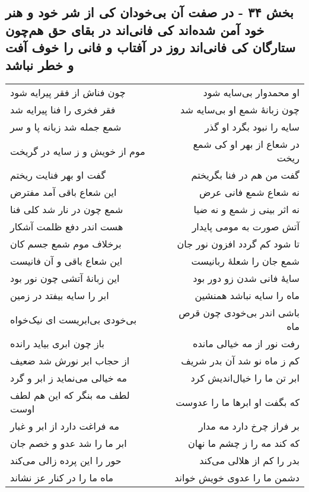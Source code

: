 \begin{center}
\section*{بخش ۳۴ - در صفت آن بی‌خودان کی از شر خود و هنر خود آمن شده‌اند کی فانی‌اند  در بقای حق هم‌چون ستارگان کی  فانی‌اند روز در آفتاب و  فانی را خوف آفت و خطر نباشد}
\label{sec:sh034}
\begin{longtable}{l p{0.5cm} r}
چون فناش از فقر پیرایه شود
&&
او محمدوار بی‌سایه شود
\\
فقر فخری را فنا پیرایه شد
&&
چون زبانهٔ شمع او بی‌سایه شد
\\
شمع جمله شد زبانه پا و سر
&&
سایه را نبود بگرد او گذر
\\
موم از خویش و ز سایه در گریخت
&&
در شعاع از بهر او کی شمع ریخت
\\
گفت او بهر فنایت ریختم
&&
گفت من هم در فنا بگریختم
\\
این شعاع باقی آمد مفترض
&&
نه شعاع شمع فانی عرض
\\
شمع چون در نار شد کلی فنا
&&
نه اثر بینی ز شمع و نه ضیا
\\
هست اندر دفع ظلمت آشکار
&&
آتش صورت به مومی پایدار
\\
برخلاف موم شمع جسم کان
&&
تا شود کم گردد افزون نور جان
\\
این شعاع باقی و آن فانیست
&&
شمع جان را شعلهٔ ربانیست
\\
این زبانهٔ آتشی چون نور بود
&&
سایهٔ فانی شدن زو دور بود
\\
ابر را سایه بیفتد در زمین
&&
ماه را سایه نباشد همنشین
\\
بی‌خودی بی‌ابریست ای نیک‌خواه
&&
باشی اندر بی‌خودی چون قرص ماه
\\
باز چون ابری بیاید رانده
&&
رفت نور از مه خیالی مانده
\\
از حجاب ابر نورش شد ضعیف
&&
کم ز ماه نو شد آن بدر شریف
\\
مه خیالی می‌نماید ز ابر و گرد
&&
ابر تن ما را خیال‌اندیش کرد
\\
لطف مه بنگر که این هم لطف اوست
&&
که بگفت او ابرها ما را عدوست
\\
مه فراغت دارد از ابر و غبار
&&
بر فراز چرخ دارد مه مدار
\\
ابر ما را شد عدو و خصم جان
&&
که کند مه را ز چشم ما نهان
\\
حور را این پرده زالی می‌کند
&&
بدر را کم از هلالی می‌کند
\\
ماه ما را در کنار عز نشاند
&&
دشمن ما را عدوی خویش خواند
\\

\end{longtable}
\end{center}
